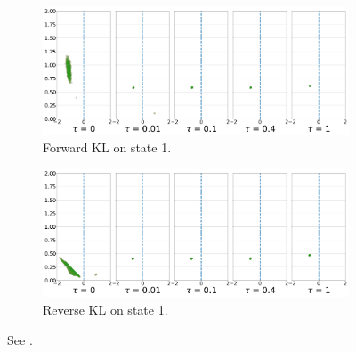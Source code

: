 \documentclass[\main/thesis.tex]{subfiles}
\begin{document}
  


\begin{figure}[!htb]
\centering
\begin{subfigure}[b]{0.85\linewidth}
    \centering
    \includegraphics[width=\columnwidth]{figs/continuous-switch-stay/notlearnQ/state1_pi_forward_optim=rmsprop_lr=0.01.png}
    \caption{Forward KL on state 1.}
    \label{fig:cont-switch-stay-forward-s1}
  \end{subfigure}\hspace{15pt}
  
  \begin{subfigure}[b]{0.85\linewidth}
        \centering
        \includegraphics[width=\columnwidth]{figs/continuous-switch-stay/notlearnQ/state1_pi_reverse_optim=rmsprop_lr=0.01.png}
        \caption{Reverse KL on state 1.}
        \label{fig:cont-switch-stay-reverse-s1}
  \end{subfigure}
  \caption{See .}
  \label{fig:final-ss-probs-1}
\end{figure}
\end{document}
